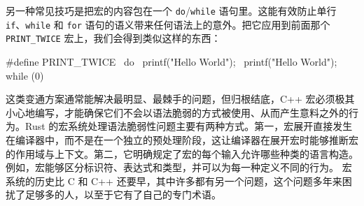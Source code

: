 \label{idx:idx_8268640e}
另一种常见技巧是把宏的内容包在一个 \texttt{do}/\texttt{while} 语句里。这能有效防止单行 \texttt{if}、\texttt{while} 和
\texttt{for} 语句的语义带来任何语法上的意外。把它应用到前面那个 \texttt{PRINT\_\allowbreak{}TWICE} 宏上，我们会得到类似这样的东西：
\begin{codebox}[text]
#define PRINT_TWICE \
    do { \
        printf("Hello World\n"); \
        printf("Hello World\n"); \
    } while (0)
\end{codebox}
这类变通方案通常能解决最明显、最棘手的问题，但归根结底，C++ 宏必须极其小心地编写，才能确保它们不会以语法脆弱的方式被使用、从而产生意料之外的行为。Rust 的宏系统处理语法脆弱性问题主要有两种方式。第一，宏展开直接发生在编译器中，而不是在一个独立的预处理阶段，这让编译器在展开宏时能够推断宏的作用域与上下文。第二，它明确规定了宏的每个输入允许哪些种类的语言构造。例如，宏能够区分标识符、表达式和类型，并可以为每一种定义不同的行为。
宏系统的历史比 C 和 C++ 还要早，其中许多都有另一个问题，这个问题多年来困扰了足够多的人，以至于它有了自己的专门术语。
